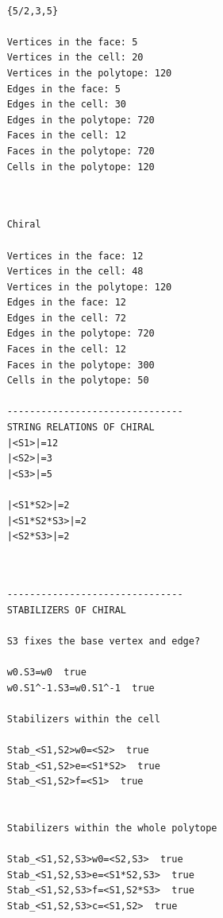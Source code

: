 \documentclass{article}
\theoremstyle{definition}
\begin{document}
\begin{appendices}
\begin{changemargin}{-2cm}{-2cm}
\begin{multicols}{2}
\begin{lstlisting}
	
	{5/2,3,5}
	
	Vertices in the face: 5
	Vertices in the cell: 20
	Vertices in the polytope: 120
	Edges in the face: 5
	Edges in the cell: 30
	Edges in the polytope: 720
	Faces in the cell: 12
	Faces in the polytope: 720
	Cells in the polytope: 120
	
	\end{lstlisting}
	\vfill\null\columnbreak
	\begin{lstlisting}
	
	Chiral
	
	Vertices in the face: 12
	Vertices in the cell: 48
	Vertices in the polytope: 120
	Edges in the face: 12
	Edges in the cell: 72
	Edges in the polytope: 720
	Faces in the cell: 12
	Faces in the polytope: 300
	Cells in the polytope: 50
	
	-------------------------------
	STRING RELATIONS OF CHIRAL
	|<S1>|=12
	|<S2>|=3
	|<S3>|=5
	
	|<S1*S2>|=2
	|<S1*S2*S3>|=2
	|<S2*S3>|=2
	
	
	\end{lstlisting}
	\vfill\null\columnbreak
	\begin{lstlisting}
	-------------------------------
	STABILIZERS OF CHIRAL
	
	S3 fixes the base vertex and edge?
	
	w0.S3=w0  true
	w0.S1^-1.S3=w0.S1^-1  true

	Stabilizers within the cell
	
	Stab_<S1,S2>w0=<S2>  true
	Stab_<S1,S2>e=<S1*S2>  true
	Stab_<S1,S2>f=<S1>  true
	
	
	Stabilizers within the whole polytope
	
	Stab_<S1,S2,S3>w0=<S2,S3>  true
	Stab_<S1,S2,S3>e=<S1*S2,S3>  true
	Stab_<S1,S2,S3>f=<S1,S2*S3>  true
	Stab_<S1,S2,S3>c=<S1,S2>  true
\end{lstlisting}
\end{multicols}
\end{changemargin}
\vspace{-1cm}

\end{appendices}
\end{document}
